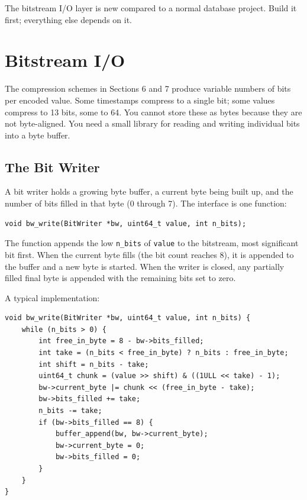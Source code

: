 \documentclass[11pt,a4paper]{article}
\begin{document}
The bitstream I/O layer is new compared to a normal database project. Build it first; everything else depends on it.

\section{Bitstream I/O}

The compression schemes in Sections 6 and 7 produce variable numbers of bits per encoded value. Some timestamps compress to a single bit; some values compress to 13 bits, some to 64. You cannot store these as bytes because they are not byte-aligned. You need a small library for reading and writing individual bits into a byte buffer.

\subsection{The Bit Writer}
A bit writer holds a growing byte buffer, a current byte being built up, and the number of bits filled in that byte (0 through 7). The interface is one function:

\begin{codebox}
\begin{lstlisting}
void bw_write(BitWriter *bw, uint64_t value, int n_bits);
\end{lstlisting}
\end{codebox}

The function appends the low \texttt{n\_bits} of \texttt{value} to the bitstream, most significant bit first. When the current byte fills (the bit count reaches 8), it is appended to the buffer and a new byte is started. When the writer is closed, any partially filled final byte is appended with the remaining bits set to zero.

A typical implementation:

\begin{codebox}
\begin{lstlisting}
void bw_write(BitWriter *bw, uint64_t value, int n_bits) {
    while (n_bits > 0) {
        int free_in_byte = 8 - bw->bits_filled;
        int take = (n_bits < free_in_byte) ? n_bits : free_in_byte;
        int shift = n_bits - take;
        uint64_t chunk = (value >> shift) & ((1ULL << take) - 1);
        bw->current_byte |= chunk << (free_in_byte - take);
        bw->bits_filled += take;
        n_bits -= take;
        if (bw->bits_filled == 8) {
            buffer_append(bw, bw->current_byte);
            bw->current_byte = 0;
            bw->bits_filled = 0;
        }
    }
}
\end{lstlisting}
\end{codebox}
\end{document}
